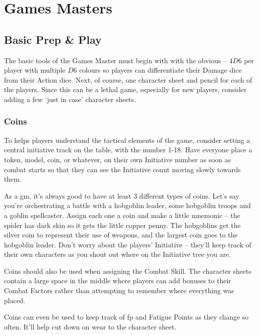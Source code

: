 \chapter{Games Masters}

\section{Basic Prep \& Play}

\begin{multicols}{2}

\noindent
The basic tools of the Games Master must begin with with the obvious -- $4D6$ per player with multiple $D6$ colours so players can differentiate their Damage dice from their Action dice.
Next, of course, one character sheet and pencil for each of the players.
Since this can be a lethal game, especially for new players, consider adding a few `just in case' character sheets.

\subsection{Coins}

To helps players understand the tactical elements of the game, consider setting a central initiative track on the table, with the number 1-18.
Have everyone place a token, model, coin, or whatever, on their own Initiative number as soon as combat starts so that they can see the Initiative count moving slowly towards them.

As a \gls{gm}, it's always good to have at least 3 different types of coins.
Let's say you're orchestrating a battle with a hobgoblin leader, some hobgoblin troops and a goblin spellcaster.
Assign each one a coin and make a little mnemonic -- the spider has dark skin so it gets the little copper penny.
The hobgoblins get the silver coin to represent their use of weapons, and the largest coin goes to the hobgoblin leader.
Don't worry about the players' Initiative -- they'll keep track of their own characters as you shout out where on the Initiative tree you are.

Coins should also be used when assigning the Combat Skill.
The character sheets contain a large space in the middle where players can add bonuses to their Combat Factors rather than attempting to remember where everything was placed.

Coins can even be used to keep track of \gls{fp} and Fatigue Points as they change so often.
It'll help cut down on wear to the character sheet.

\end{multicols}

